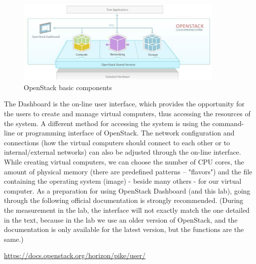 \documentclass[a4paper]{article}
\begin{document}
\begin{figure}[H]
    \centering
    \includegraphics[width=0.9\textwidth]{figures/components.png}
    \caption{OpenStack basic components}
    \label{fig:oscomponents}
\end{figure}

The Dashboard is the on-line user interface, which provides the opportunity for the users to create and manage virtual
computers, thus accessing the resources of the system. A different method for accessing the system is using the
command-line or programming interface of OpenStack. The network configuration and connections (how the virtual
computers should connect to each other or to internal/external networks) can also be adjusted through the on-line
interface. While creating virtual computers, we can choose the number of CPU cores, the amount of physical memory
(there are predefined patterns – "flavors") and the file containing the operating system (image) - beside many others -
for our virtual computer.
As a preparation for using OpenStack Dashboard (and this lab), going through the following official documentation is strongly recommended.
(During the measurement in the lab, the interface will not exactly match the one detailed in the text, because in the
lab we use an older version of OpenStack, and the documentation is only available for the latest version, but the
functions are the same.)

\url{https://docs.openstack.org/horizon/pike/user/}
\end{document}
